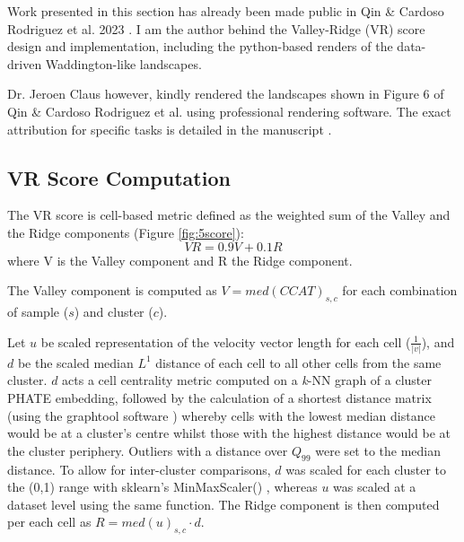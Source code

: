 Work presented in this section has already been made public in Qin \& Cardoso Rodriguez et al. 2023 \cite{cardoso_rodriguez_single-cell_2023}. I am the author behind the Valley-Ridge (VR) score design and implementation, including the python-based renders of the data-driven Waddington-like landscapes. 

Dr. Jeroen Claus however, kindly rendered the landscapes shown in Figure 6 of Qin \& Cardoso Rodriguez et al. using professional rendering software. The exact attribution for specific tasks is detailed in the manuscript \cite{cardoso_rodriguez_single-cell_2023}.

\subsection{VR Score Computation}

The VR score is cell-based metric defined as the weighted sum of the Valley and the Ridge components (Figure \ref{fig:5score}):
\[VR = 0.9V+0.1R\]
where V is the Valley component and R the Ridge component.

The Valley component is computed as \(V = med(CCAT)_{s,c}\) for each combination of sample (\(s\)) and cluster (\(c\)). 

Let $u$ be scaled representation of the velocity vector length for each cell ($\frac{1}{|v|}$), and $d$ be the scaled median $L^1$ distance of each cell to all other cells from the same cluster. $d$ acts a cell centrality metric computed on a \emph{k}-NN graph of a cluster PHATE embedding, followed by the calculation of a shortest distance matrix (using the graphtool software \cite{peixoto_graph-tool_2014}) whereby cells with the lowest median distance would be at a cluster's centre whilst those with the highest distance would be at the cluster periphery. Outliers with a distance over $Q_{99}$ were set to the median distance. 
To allow for inter-cluster comparisons, $d$ was scaled for each cluster to the (0,1) range with sklearn's MinMaxScaler() \cite{pedregosa_scikit-learn_2011}, whereas $u$ was scaled at a dataset level using the same function.
The Ridge component is then computed per each cell as $R = med(u)_{s,c} \cdot d$. 


